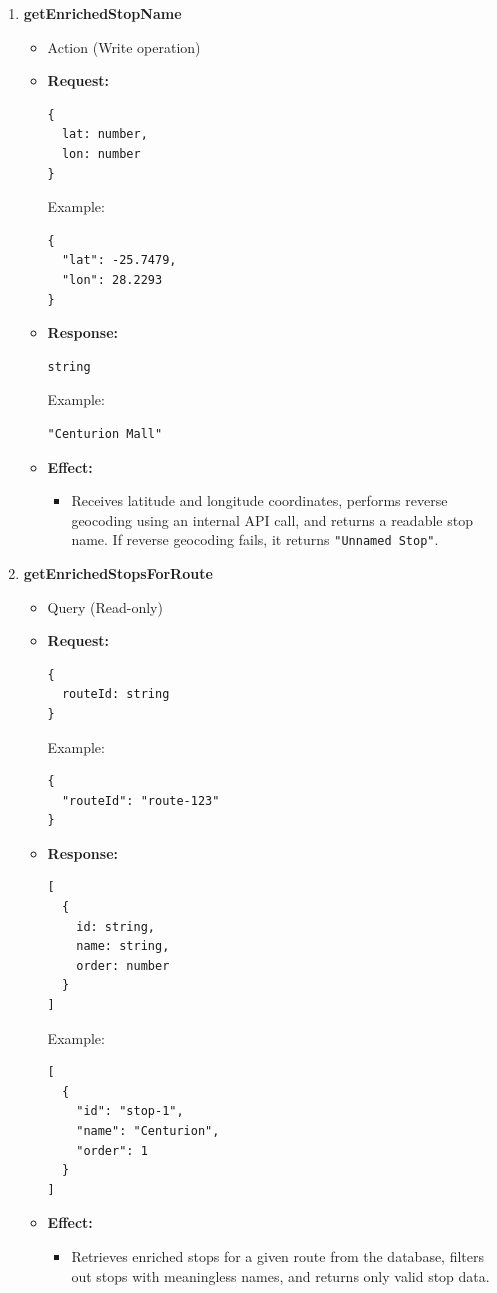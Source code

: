 \documentclass[a4paper,12pt]{article}
\begin{document}
\begin{enumerate}
  \item \textbf{getEnrichedStopName}
    \begin{itemize}
      \item Action (Write operation)
      \item \textbf{Request:}
      \begin{verbatim}
{
  lat: number,
  lon: number
}
      \end{verbatim}
      Example:
      \begin{verbatim}
{
  "lat": -25.7479,
  "lon": 28.2293
}
      \end{verbatim}
      \item \textbf{Response:}
      \begin{verbatim}
string
      \end{verbatim}
      Example:
      \begin{verbatim}
"Centurion Mall"
      \end{verbatim}
      \item \textbf{Effect:}
      \begin{itemize}
        \item Receives latitude and longitude coordinates, performs reverse geocoding using an internal API call, and returns a readable stop name. If reverse geocoding fails, it returns \texttt{"Unnamed Stop"}.
      \end{itemize}
    \end{itemize}

  \item \textbf{getEnrichedStopsForRoute}
    \begin{itemize}
      \item Query (Read-only)
      \item \textbf{Request:}
      \begin{verbatim}
{
  routeId: string
}
      \end{verbatim}
      Example:
      \begin{verbatim}
{
  "routeId": "route-123"
}
      \end{verbatim}
      \item \textbf{Response:}
      \begin{verbatim}
[
  {
    id: string,
    name: string,
    order: number
  }
]
      \end{verbatim}
      Example:
      \begin{verbatim}
[
  {
    "id": "stop-1",
    "name": "Centurion",
    "order": 1
  }
]
      \end{verbatim}
      \item \textbf{Effect:}
      \begin{itemize}
        \item Retrieves enriched stops for a given route from the database, filters out stops with meaningless names, and returns only valid stop data.
      \end{itemize}
    \end{itemize}


\end{enumerate}
\end{document}

